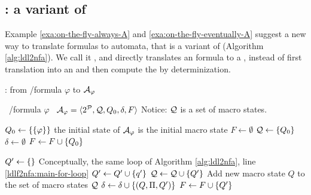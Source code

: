 \subsection{\LDLfToDFA: a variant of \LDLfToNFA}\label{sect:llf2dfa}

Example \ref{exa:on-the-fly-always-A} and \ref{exa:on-the-fly-eventually-A} suggest a new way to translate \LLf formulas to automata, that is a variant of \LDLfToNFA (Algorithm \ref{alg:ldl2nfa}). We call it \LDLfToDFA, and directly translates an \LLf formula to a \DFA, instead of first translation into an \NFA and then compute the \DFA by determinization.

\begin{algorithm}
	\caption{\LDLfToDFA: from \LTLf/\LDLf formula $\varphi$ to \DFA $\mathcal{A}_\varphi$}
	\label{alg:ldlf2dfa}
	\begin{algorithmic}[1]
		\State \algInput\ \LDLf/\LTLf formula $\varphi$
		\State \algOutput\ \DFA $\mathcal{A}_\varphi = \langle 2^{\mathcal{P}}, \mathcal{Q}, Q_0, \delta, F \rangle$ \Comment Notice: $\mathcal{Q}$ is a set of macro states.
		
		\State $Q_0 \gets \{\{\varphi\}\}$ \Comment the initial state of $\mathcal{A}_\varphi$ is the initial macro state
		\State $F \gets \emptyset$
		\State $\mathcal{Q} \gets \{Q_0\}$
		\State $\delta \gets \emptyset$
		 \label{ldlf2dfa:delta-eps-init}
			\State $F \gets F \cup \{Q_0\}$
		\EndIf
		
				\State $Q' \gets \{\}$
				 \label{ldlf2dfa:main-for-loop}\Comment Conceptually, the same loop of Algorithm \ref{alg:ldl2nfa}, line \ref{ldlf2nfa:main-for-loop}
					 \label{ldlf2dfa:delta-for-loop}
						\State $Q' \gets Q' \cup \{q'\}$
					\EndIf
				\EndFor
				\State $\mathcal{Q} \gets \mathcal{Q} \cup \{Q'\}$ \Comment Add new macro state  $Q$ to the set of macro states $\mathcal{Q}$
				\State $\delta \gets \delta \cup \{(Q, \Pi, Q')\}$
				 \label{ldlf2dfa:delta-eps-end}
					\State $F \gets F \cup \{Q'\}$
				\EndIf
			\EndFor
		
		\EndWhile
		
	\end{algorithmic}
	
\end{algorithm}
